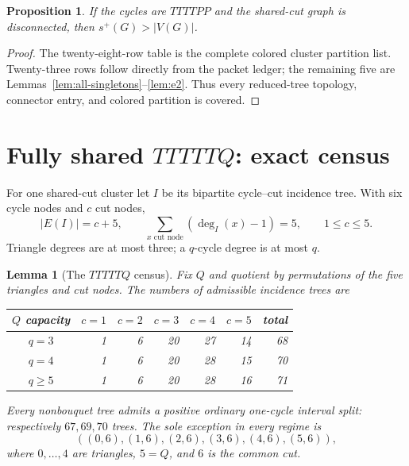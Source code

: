 \documentclass[11pt]{article}
\newtheorem{lemma}[theorem]{Lemma}
\newtheorem{proposition}[theorem]{Proposition}
\newcommand{\spE}{s^+}
\begin{document}
\begin{proposition}\label{prop:disconnected-ttttpp}
If the cycles are $TTTTPP$ and the shared-cut graph is disconnected, then
$\spE(G)>|V(G)|$.
\end{proposition}
\begin{proof}
The twenty-eight-row table is the complete colored cluster partition list.
Twenty-three rows follow directly from the packet ledger; the remaining five
are Lemmas~\ref{lem:all-singletons}--\ref{lem:e2}.  Thus every reduced-tree
topology, connector entry, and colored partition is covered.
\end{proof}

\section{Fully shared $TTTTTQ$: exact census}

For one shared-cut cluster let $I$ be its bipartite cycle--cut incidence tree.
With six cycle nodes and $c$ cut nodes,
\begin{equation}\label{eq:incidence}
 |E(I)|=c+5,
 \qquad \sum_{x\text{ cut node}}(\deg_I(x)-1)=5,
 \qquad 1\leq c\leq5.
\end{equation}
Triangle degrees are at most three; a $q$-cycle degree is at most $q$.

\begin{lemma}[The $TTTTTQ$ census]\label{lem:q-census}
Fix $Q$ and quotient by permutations of the five triangles and cut nodes.  The
numbers of admissible incidence trees are
\begin{center}
\begin{tabular}{c|rrrrr|r}
$Q$ capacity&$c=1$&$c=2$&$c=3$&$c=4$&$c=5$&total\\ \hline
$q=3$&1&6&20&27&14&68\\
$q=4$&1&6&20&28&15&70\\
$q\geq5$&1&6&20&28&16&71
\end{tabular}
\end{center}
Every nonbouquet tree admits a positive ordinary one-cycle interval split:
respectively $67,69,70$ trees.  The sole exception in every regime is
\begin{equation}\label{eq:q-bouquet}
 ((0,6),(1,6),(2,6),(3,6),(4,6),(5,6)),
\end{equation}
where $0,\ldots,4$ are triangles, $5=Q$, and $6$ is the common cut.
\end{lemma}
\end{document}
